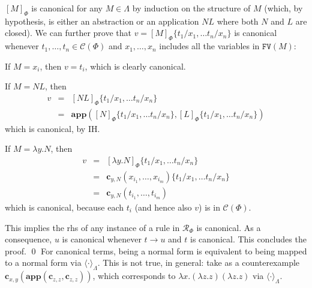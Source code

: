 \documentclass{LMCS}
\newcommand{\varone}{x}
\newcommand{\vartwo}{y}
\newcommand{\varthree}{z}
\newcommand{\lambdaone}{M}
\newcommand{\lambdatwo}{N}
\newcommand{\lambdathree}{L}
\newcommand{\termone}{t}
\newcommand{\termtwo}{u}
\newcommand{\termthree}{v}
\newcommand{\appTRS}{\mathbf{app}}
\newcommand{\constr}[2]{\mathbf{c}_{#1,#2}}
\newcommand{\LambdatoTRS}[1]{[#1]_{\Phi}}
\newcommand{\TRStolambda}[1]{\langle{#1}\rangle_{\Lambdaterms}}
\newcommand{\Lambdaterms}{\Lambda}
\newcommand{\Rules}[1]{\mathcal{R}_{#1}}
\newcommand{\TRS}{\Phi}
\newcommand{\TRSconterms}{\mathcal{C}(\Phi)}
\newcommand{\rewrTRS}{\rightarrow}
\newcommand{\FV}[1]{\mathtt{FV}(#1)}
\newenvironment{varitemize}
{
\begin{list}{\labelitemi}
{\setlength{\itemsep}{0.0mm}
 \setlength{\topsep}{0.0mm}
 \setlength{\parindent}{0.0mm}
 \setlength{\parskip}{0.0mm}
 \setlength{\parsep}{0.0mm}
 \setlength{\partopsep}{0.0mm}
 \setlength{\leftmargin}{15pt}
 \setlength{\labelsep}{5pt}
 \setlength{\labelwidth}{10pt}}}
{
 \end{list} 
}
\begin{document}
$\LambdatoTRS{\lambdaone}$ is canonical for any $\lambdaone\in\Lambdaterms$ by
induction on the structure of $\lambdaone$ (which, by hypothesis, is either an
abstraction or an application $\lambdatwo\lambdathree$ where both
$\lambdatwo$ and $\lambdathree$ are closed). We can further prove that
$\termthree=\LambdatoTRS{\lambdaone}\{\termone_1/\varone_1,\ldots\termone_n/\varone_n\}$
is canonical whenever $\termone_1,\ldots,\termone_n\in\TRSconterms$ and
$\varone_1,\ldots,\varone_n$ includes all the variables in $\FV{\lambdaone}$:
\begin{varitemize}
\item
  If $\lambdaone=\varone_i$, then $\termthree=\termone_i$, which is
  clearly canonical.
\item
  If $\lambdaone=\lambdatwo\lambdathree$, then
  \begin{eqnarray*}
  \termthree&=&\LambdatoTRS{\lambdatwo\lambdathree}\{\termone_1/\varone_1,\ldots\termone_n/\varone_n\}\\
     &=&\appTRS\left(\LambdatoTRS{\lambdatwo}\{\termone_1/\varone_1,\ldots\termone_n/\varone_n\},
        \LambdatoTRS{\lambdathree}\{\termone_1/\varone_1,\ldots\termone_n/\varone_n\}\right)
  \end{eqnarray*}
  which is canonical, by IH.
\item
  If $\lambdaone=\lambda\vartwo.\lambdatwo$, then
  \begin{eqnarray*}
  \termthree&=&\LambdatoTRS{\lambda\vartwo.\lambdatwo}\{\termone_1/\varone_1,\ldots\termone_n/\varone_n\}\\
     &=&\constr{\vartwo}{\lambdatwo}(\varone_{i_1},\ldots,\varone_{i_m})\{\termone_1/\varone_1,\ldots\termone_n/\varone_n\}\\
     &=&\constr{\vartwo}{\lambdatwo}(\termone_{i_1},\ldots,\termone_{i_m})
  \end{eqnarray*}
  which is canonical, because each $\termone_i$ (and hence also $\termthree$) is in $\TRSconterms$.
\end{varitemize}
This implies the rhs of any instance of a rule in $\Rules{\TRS}$ is canonical. As a consequence,
$\termtwo$ is canonical whenever $\termone\rewrTRS\termtwo$ and $\termone$ is canonical.
This concludes the proof. 
\qed
For canonical terms, being a normal form is equivalent to being mapped to a normal
form via $\TRStolambda{\cdot}$. This is not true, in general: take as a counterexample
$\constr{\varone}{\vartwo}(\appTRS(\constr{\varthree}{\varthree},\constr{\varthree}{\varthree}))$,
which corresponds to $\lambda\varone.(\lambda\varthree.\varthree)(\lambda\varthree.\varthree)$ via $\TRStolambda{\cdot}$.
\end{document}
